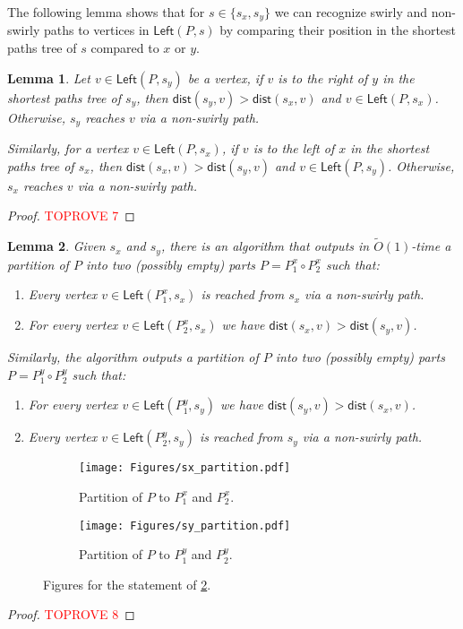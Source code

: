\documentclass{article}
\newcommand{\Left}{\mathsf{Left}}
\newcommand{\dist}{\mathsf{dist}}
\newtheorem{lemma}{Lemma}
\newcommand{\Otild}{\tilde{O}}
\begin{document}
The following lemma shows that for $s\in\{s_x,s_y\}$ we can recognize swirly and non-swirly paths to vertices in $\Left(P,s)$ by comparing their position in the shortest paths tree of $s$ compared to $x$ or $y$.
\begin{lemma}\label{lem:rightloseleftswirl}
    Let $v \in \Left(P,s_y)$ be a vertex,
    if $v$ is to the right of $y$ in the shortest paths tree of $s_y$, then $\dist(s_y,v) > \dist(s_x,v)$ and $v\in \Left(P,s_x)$.
    Otherwise, $s_y$ reaches $v$ via a non-swirly path.

    Similarly, for a vertex $v\in\Left(P,s_x)$, if $v$ is to the left of $x$ in the shortest paths tree of $s_x$, then $\dist(s_x,v) > \dist(s_y,v)$ and $v\in \Left(P,s_y)$.
    Otherwise, $s_x$ reaches $v$ via a non-swirly path.
\end{lemma}
\begin{proof}\textcolor{red}{TOPROVE 7}\end{proof}



\begin{lemma}\label{lem:sxsyswirlypartition}
    Given $s_x$ and $s_y$, there is an algorithm that outputs in $\Otild(1)$-time a partition of $P$ into two (possibly empty) parts $P=P^x_1\circ P^x_2$  such that:
    \begin{enumerate}
        \item Every vertex $v\in\Left(P^x_1,s_x)$ is reached from $s_x$ via a non-swirly path.
        \item For every vertex $v\in \Left(P^x_2,s_x)$ we have $\dist(s_x,v)>\dist(s_y,v)$.
    \end{enumerate}
    Similarly, the algorithm outputs a partition of $P$ into two (possibly empty) parts $P=P^y_1\circ P^y_2$  such that:
    \begin{enumerate}
        \item For every vertex $v\in \Left(P^y_1,s_y)$ we have  $\dist(s_y,v)>\dist(s_x,v)$.
        \item Every vertex $v\in \Left(P^y_2,s_y)$ is reached from $s_y$ via a non-swirly path.
    \end{enumerate}
\end{lemma}
\begin{figure}[ht]
    \centering
    \begin{subfigure}[t]{0.3\textwidth}
        \centering
        \texttt{[image: Figures/sx\_partition.pdf]}
        \caption{Partition of $P$ to $P^x_1$ and $P^x_2$.}
    \end{subfigure}
    \hspace{1in}
    \begin{subfigure}[t]{0.3\textwidth}
        \centering
        \texttt{[image: Figures/sy\_partition.pdf]}
        \caption{Partition of $P$ to $P^y_1$ and $P^y_2$.}
        \label{fig:Py12}
    \end{subfigure}
    \caption{Figures for the statement of  \cref{lem:sxsyswirlypartition}.}
    \label{fig:Px12Py12}
\end{figure}
\begin{proof}\textcolor{red}{TOPROVE 8}\end{proof}
\end{document}
